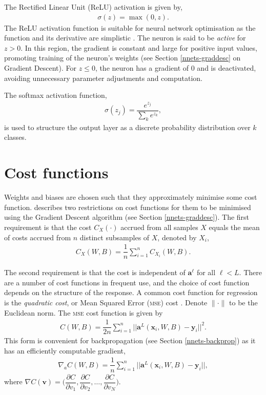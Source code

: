 The Rectified Linear Unit (ReLU) activation \citep{Maas2013} is given by,
\begin{align}
	\sigma(z) = \max(0, z).
\end{align}
The ReLU activation function is suitable for neural network optimisation as the function and its derivative are simplistic \citep{Goodfellow-et-al-2016}. The neuron is said to be \textit{active} for $z > 0$. In this region, the gradient is constant and large for positive input values, promoting training of the neuron's weights (see Section \ref{nnets-graddesc} on Gradient Descent). For $z \leq 0$, the neuron has a gradient of 0 and is deactivated, avoiding unnecessary parameter adjustments and computation. 

The softmax activation function,
\begin{align}
	\sigma(z_j) = \dfrac{e^{z_j}}{\sum_ke^{z_k}},
\end{align}
is used to structure the output layer as a discrete probability distribution over $k$ classes.


\section{Cost functions}\label{nnets-cost}

Weights and biases are chosen such that they approximately minimise some cost function. \cite{Nielson2015} describes two restrictions on cost functions for them to be minimised using the Gradient Descent algorithm (see Section \ref{nnets-graddesc}). The first requirement is that the cost $C_X(\cdot)$ accrued from all samples $X$ equals the mean of costs accrued from $n$ distinct subsamples of $X$, denoted by $X_i$,
\begin{align}
	C_X(W, B) = \dfrac{1}{n}\sum_{i=1}^n C_{X_i}(W,B).
\end{align}

The second requirement is that the cost is independent of $\mathbf{a}^\ell$ for all $\ell < L$. There are a number of cost functions in frequent use, and the choice of cost function depends on the structure of the response. A common cost function for regression is the \textit{quadratic cost}, or Mean Squared Error (\textsc{mse}) cost \citep{Nielson2015}. Denote $\|\cdot\|$ to be the Euclidean norm. The \textsc{mse} cost function is given by
\begin{align}
	C(W,B) = \dfrac{1}{2n}\sum_{i=1}^n||\mathbf{a}^L(\mathbf{x}_i,W,B) - \mathbf{y}_i ||^2.
\end{align}
This form is convenient for backpropagation (see Section \ref{nnets-backprop}) as it has an efficiently computable gradient,
\begin{align}
	\nabla_aC(W,B) = \dfrac{1}{n}\sum_{i=1}^n||\mathbf{a}^L(\mathbf{x}_i,W,B) - \mathbf{y}_i ||,
\end{align}
where $\nabla C(\mathbf{v}) = \Big(\dfrac{\partial C}{\partial v_1}, \dfrac{\partial C}{\partial v_2},\ldots, \dfrac{\partial C}{\partial v_N}\Big)$.

